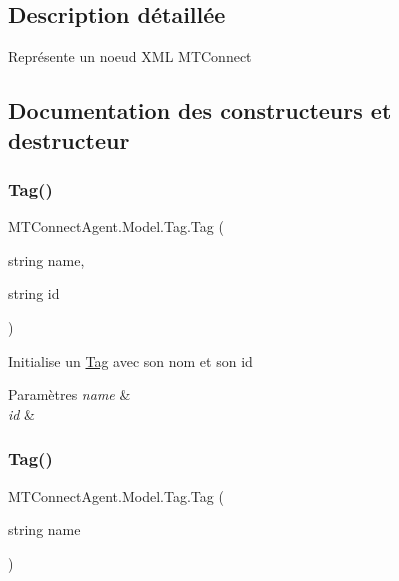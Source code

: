 \subsection{Description détaillée}
Représente un noeud X\+ML M\+T\+Connect 



\subsection{Documentation des constructeurs et destructeur}
\mbox{\label{class_m_t_connect_agent_1_1_model_1_1_tag_a7a97e2920ac3143e7e54ff26e5e43d0a}} 
\subsubsection{\texorpdfstring{Tag()}{Tag()}\hspace{0.1cm}{\footnotesize\ttfamily [1/2]}}
{\footnotesize\ttfamily M\+T\+Connect\+Agent.\+Model.\+Tag.\+Tag (\begin{DoxyParamCaption}\item[{string}]{name,  }\item[{string}]{id }\end{DoxyParamCaption})\hspace{0.3cm}{\ttfamily [inline]}}



Initialise un \mbox{\hyperlink{class_m_t_connect_agent_1_1_model_1_1_tag}{Tag}} avec son nom et son id 


\begin{DoxyParams}{Paramètres}
{\em name} & \\
\hline
{\em id} & \\
\hline
\end{DoxyParams}
\mbox{\label{class_m_t_connect_agent_1_1_model_1_1_tag_a52a0e7d9a403166030deed02bd876697}} 
\subsubsection{\texorpdfstring{Tag()}{Tag()}\hspace{0.1cm}{\footnotesize\ttfamily [2/2]}}
{\footnotesize\ttfamily M\+T\+Connect\+Agent.\+Model.\+Tag.\+Tag (\begin{DoxyParamCaption}\item[{string}]{name }\end{DoxyParamCaption})\hspace{0.3cm}{\ttfamily [inline]}}




